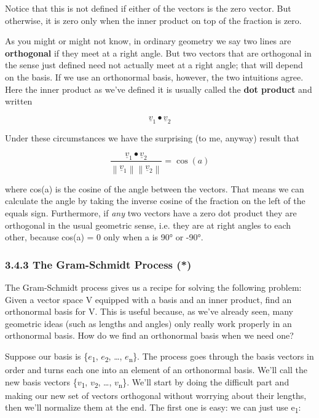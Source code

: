 \documentclass[oneside,english]{amsbook}
\numberwithin{section}{chapter}
\theoremstyle{plain}
\theoremstyle{definition}
\begin{document}
Notice that this is not defined if either of the vectors is the zero
vector. But otherwise, it is zero only when the inner product on top of
the fraction is zero.

As you might or might not know, in ordinary geometry we say two lines
are \textbf{orthogonal} if they meet at a right angle. But two vectors
that are orthogonal in the sense just defined need not actually meet at
a right angle; that will depend on the basis. If we use an orthonormal
basis, however, the two intuitions agree. Here the inner product as
we've defined it is usually called the \textbf{dot product} and written

\[{\underline{v}}_{1} \bullet {\underline{v}}_{2}\]

Under these circumstances we have the surprising (to me, anyway) result
that

\[\frac{{\underline{v}}_{1} \bullet {\underline{v}}_{2}}{\left\| {\underline{v}}_{1} \right\|\left\| {\underline{v}}_{2} \right\|} = \cos{(a)}\]

where cos(a) is the cosine of the angle between the vectors. That means
we can calculate the angle by taking the inverse cosine of the fraction
on the left of the equals sign. Furthermore, if \emph{any} two vectors
have a zero dot product they are orthogonal in the usual geometric
sense, i.e. they are at right angles to each other, because cos(a) = 0
only when a is 90° or -90°.

\subsubsection{3.4.3 The Gram-Schmidt Process
	(*)}\label{the-gram-schmidt-process}

The Gram-Schmidt process gives us a recipe for solving the following
problem: Given a vector space V equipped with a basis and an inner
product, find an orthonormal basis for V. This is useful because, as
we've already seen, many geometric ideas (such as lengths and angles)
only really work properly in an orthonormal basis. How do we find an
orthonormal basis when we need one?

Suppose our basis is \{$e$\textsubscript{1}, $e$\textsubscript{2},
\ldots, $e$\textsubscript{n}\}. The process goes through the basis
vectors in order and turns each one into an element of an orthonormal
basis. We'll call the new basis vectors \{$v$\textsubscript{1},
$v$\textsubscript{2}, \ldots, $v$\textsubscript{n}\}. We'll start
by doing the difficult part and making our new set of vectors orthogonal
without worrying about their lengths, then we'll normalize them at the
end. The first one is easy: we can just use e\textsubscript{1}:
\end{document}
